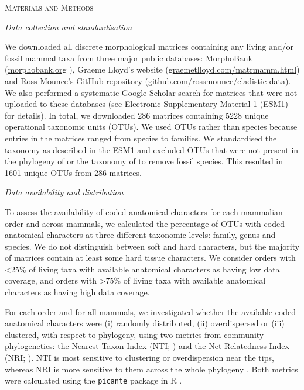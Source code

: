 \documentclass[12pt,letterpaper]{article}
\renewcommand{\section}[1]{%
\bigskip
\begin{center}
\begin{Large}
\normalfont\scshape #1
\medskip
\end{Large}
\end{center}}
\renewcommand{\subsection}[1]{%
\bigskip
\begin{center}
\begin{large}
\normalfont\itshape #1
\end{large}
\end{center}}
\begin{document}
%
%
\section{Materials and Methods}
\subsection{Data collection and standardisation}
We downloaded all discrete morphological matrices containing any living and/or fossil mammal taxa from three major public databases: MorphoBank (\url{morphobank.org} \cite{morphobank}), Graeme Lloyd's website (\url{graemetlloyd.com/matrmamm.html}) and Ross Mounce's GitHub repository (\url{github.com/rossmounce/cladistic-data}).
We also performed a systematic Google Scholar search for matrices that were not uploaded to these databases (see Electronic Supplementary Material 1 (ESM1) for details).
In total, we downloaded 286 matrices containing 5228 unique operational taxonomic units (OTUs). 
We used OTUs rather than species because entries in the matrices ranged from species to families. 
We standardised the taxonomy as described in the ESM1 and excluded OTUs that were not present in the phylogeny of \cite{BinindaEmonds} or the taxonomy of \cite{wilson2005mammal} to remove fossil species.
This resulted in 1601 unique OTUs from 286 matrices.

\subsection{Data availability and distribution}
To assess the availability of coded anatomical characters for each mammalian order and across mammals, we calculated the percentage of OTUs with coded anatomical characters at three different taxonomic levels: family, genus and species.
We do not distinguish between soft and hard characters, but the majority of matrices contain at least some hard tissue characters. 
We consider orders with \textless 25\% of living taxa with available anatomical characters as having low data coverage, and orders with \textgreater 75\% of living taxa with available anatomical characters as having high data coverage. 

For each order and for all mammals, we investigated whether the available coded anatomical characters were (i) randomly distributed, (ii) overdispersed or (iii) clustered, with respect to phylogeny, using two metrics from community phylogenetics: the Nearest Taxon Index (NTI; \cite{webb2002phylogenies}) and the Net Relatedness Index (NRI; \cite{webb2002phylogenies}). 
NTI is most sensitive to clustering or overdispersion near the tips, whereas NRI is more sensitive to them across the whole phylogeny \cite{Cooper2008}. 
Both metrics were calculated using the \texttt{picante} package in R \cite{picante,R}.
\end{document}
